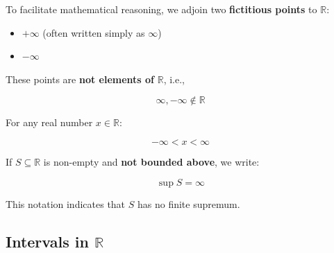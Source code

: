 \documentclass[
]{book}
\providecommand{\tightlist}{%
  \setlength{\itemsep}{0pt}\setlength{\parskip}{0pt}}
\theoremstyle{definition}
\theoremstyle{definition}
\theoremstyle{definition}
\theoremstyle{definition}
\theoremstyle{remark}
\begin{document}
To facilitate mathematical reasoning, we adjoin two \textbf{fictitious points} to \(\mathbb{R}\):

\begin{itemize}
\tightlist
\item
  \(+\infty\) (often written simply as \(\infty\))
\item
  \(-\infty\)
\end{itemize}

These points are \textbf{not elements of} \(\mathbb{R}\), i.e.,

\[
\infty, -\infty \notin \mathbb{R}
\]

For any real number \(x \in \mathbb{R}\):

\[
-\infty < x < \infty
\]

If \(S \subseteq \mathbb{R}\) is non-empty and \textbf{not bounded above}, we write:

\[
\sup S = \infty
\]

This notation indicates that \(S\) has no finite supremum.

\subsection{\texorpdfstring{Intervals in \(\mathbb{R}\)}{Intervals in \textbackslash mathbb\{R\}}}\label{intervals-in-mathbbr}
\end{document}

